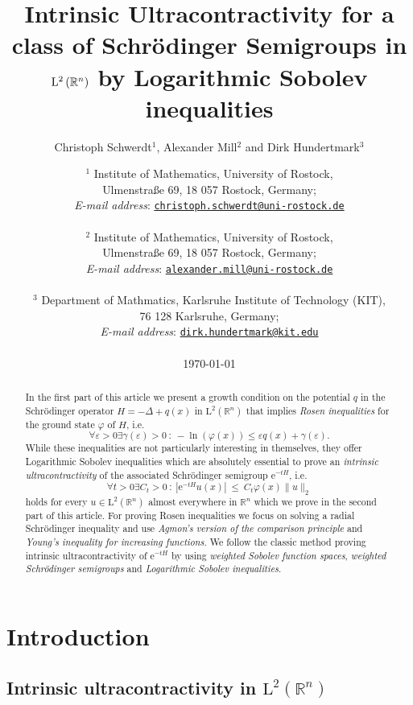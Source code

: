 \documentclass[12pt,longbibliography]{article}
\title{Intrinsic Ultracontractivity for a class of Schrödinger Semigroups in $\mathrm{L}^{2}\left( \R^{n} \right)$
by Logarithmic Sobolev inequalities}
\author{Christoph Schwerdt$^1$, Alexander Mill$^2$ and Dirk Hundertmark$^3$}
\date{%
	$^1$ Institute of Mathematics, University of Rostock,\\
	Ulmenstra\ss e 69, 18 057 Rostock, Germany; \\%
	\textit{E-mail address}: \texttt{\href{mailto:christoph.schwerdt@uni-rostock.de}{christoph.schwerdt@uni-rostock.de}}\\
	\ \\
	$^2$ Institute of Mathematics, University of Rostock,\\
	Ulmenstra\ss e 69, 18 057 Rostock, Germany; \\%
	\textit{E-mail address}: \texttt{\href{mailto:alexander.mill@uni-rostock.de}{alexander.mill@uni-rostock.de}}\\
	\ \\
	$^3$ Department of Mathmatics, Karlsruhe Institute of Technology (KIT), \\
	76 128 Karlsruhe, Germany; \\%
	\textit{E-mail address}: \texttt{\href{mailto:dirk.hundertmark@kit.edu}{dirk.hundertmark@kit.edu}}\\
	\ \\
    \today
}
\def\R{\mathbb{R}}
\theoremstyle{definition}
\theoremstyle{remark}
\theoremstyle{example}
\begin{document}
\maketitle

\begin{abstract}
In the first part of this article we present a growth condition on the potential $q$ in the Schrödinger operator 
$H=-\Delta + q(x)$ in $\mathrm{L}^{2}\left( \R^{n} \right)$ 
that implies \textit{Rosen inequalities} for the ground state $\varphi$ of $H$, i.e.
$$
\forall \varepsilon > 0 \exists \gamma(\varepsilon) > 0 \ : \ - \ln\left( \varphi(x) \right) \leq \varepsilon q(x) + \gamma(\varepsilon).
$$ 
While these inequalities are not particularly interesting in themselves, they
offer Logarithmic Sobolev inequalities which are absolutely essential to prove an \textit{intrinsic ultracontractivity} of 
the associated Schrödinger semigroup $\mathrm{e}^{-tH}$, i.e.
$$
\forall t>0 \exists C_{t} > 0 \ : \ \left| \mathrm{e}^{-tH} u (x) \right| \ \leq \ C_{t} \varphi(x) \| u \|_{2}
$$
holds for every $u \in \mathrm{L}^{2}\left( \R^{n} \right)$ almost everywhere in $\R^{n}$ which we prove in the second 
part of this article. For proving Rosen inequalities we focus on solving a radial Schrödinger inequality and use
\textit{Agmon's version of the comparison principle} and \textit{Young's inequality for increasing functions}.
We follow the classic method proving intrinsic ultracontractivity of $\mathrm{e}^{-tH}$ by using
\textit{weighted Sobolev function spaces}, \textit{weighted Schrödinger semigroups} and \textit{Logarithmic Sobolev inequalities}.\\
\end{abstract}


\tableofcontents

\section{Introduction}

\subsection{Intrinsic ultracontractivity in $\mathrm{L}^{2}(\R^{n})$}
\end{document}
